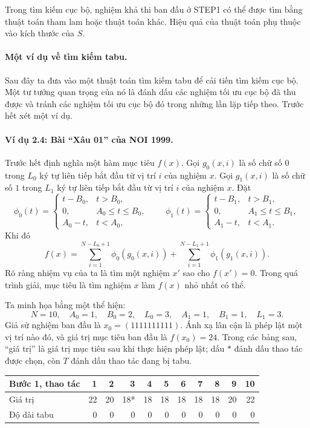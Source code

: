 \documentclass[11pt]{article}
\begin{document}
Trong tìm kiếm cục bộ, nghiệm khả thi ban đầu ở STEP1 có thể được tìm bằng
thuật toán tham lam hoặc thuật toán khác. Hiệu quả của thuật toán phụ thuộc
vào kích thước của \(S\).

\paragraph{Một ví dụ về tìm kiếm tabu.}
Sau đây ta đưa vào một thuật toán tìm kiếm tabu để cải tiến tìm kiếm cục bộ.
Một tư tưởng quan trọng của nó là đánh dấu các nghiệm tối ưu cục bộ đã thu
được và tránh các nghiệm tối ưu cục bộ đó trong những lần lặp tiếp theo.
Trước hết xét một ví dụ.

\paragraph{Ví dụ 2.4: Bài ``Xâu 01'' của NOI 1999.}
Trước hết định nghĩa một hàm mục tiêu \(f(x)\). Gọi \(g_0(x,i)\) là số chữ số
\(0\) trong \(L_0\) ký tự liên tiếp bắt đầu từ vị trí \(i\) của nghiệm \(x\).
Gọi \(g_1(x,i)\) là số chữ số \(1\) trong \(L_1\) ký tự liên tiếp bắt đầu từ
vị trí \(i\) của nghiệm \(x\). Đặt
\[
\phi_0(t)=
\begin{cases}
t-B_0, & t>B_0,\\
0, & A_0\le t\le B_0,\\
A_0-t, & t<A_0,
\end{cases}
\qquad
\phi_1(t)=
\begin{cases}
t-B_1, & t>B_1,\\
0, & A_1\le t\le B_1,\\
A_1-t, & t<A_1.
\end{cases}
\]
Khi đó
\[
  f(x)=
  \sum_{i=1}^{N-L_0+1}\phi_0(g_0(x,i))+
  \sum_{i=1}^{N-L_1+1}\phi_1(g_1(x,i)).
\]
Rõ ràng nhiệm vụ của ta là tìm một nghiệm \(x'\) sao cho \(f(x')=0\). Trong
quá trình giải, mục tiêu là tìm nghiệm \(x\) làm \(f(x)\) nhỏ nhất có thể.

Ta minh họa bằng một thể hiện:
\[
N=10,\quad A_0=1,\quad B_0=2,\quad L_0=3,\quad
A_1=1,\quad B_1=1,\quad L_1=3.
\]
Giả sử nghiệm ban đầu là \(x_0=(1111111111)\). Ánh xạ lân cận là phép lật một
vị trí nào đó, và giá trị mục tiêu ban đầu là \(f(x_0)=24\). Trong các bảng
sau, ``giá trị'' là giá trị mục tiêu sau khi thực hiện phép lật; dấu \(*\)
đánh dấu thao tác được chọn, còn \(T\) đánh dấu thao tác đang bị tabu.

\begin{table}[htbp]
\centering
\scriptsize
\begin{tabular}{lrrrrrrrrrr}
\hline
Bước 1, thao tác & 1&2&3&4&5&6&7&8&9&10\\
\hline
Giá trị & 22&20&18*&18&18&18&18&18&20&22\\
Độ dài tabu & 0&0&0&0&0&0&0&0&0&0\\
\hline
\end{tabular}
\end{table}
\end{document}
